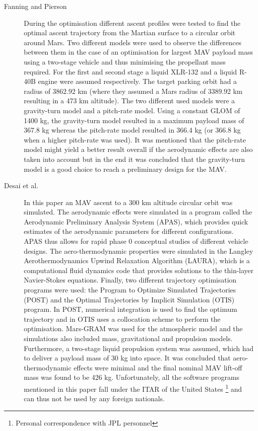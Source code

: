 
\begin{description}
\item[Fanning and Pierson \cite{fanning1996model}]During the optimisation different ascent profiles were tested to find the optimal ascent trajectory from the Martian surface to a circular orbit around Mars. Two different models were used to observe the differences between them in the case of an optimisation for largest \ac{MAV} payload mass using a two-stage vehicle and thus minimising the propellant mass required. For the first and second stage a liquid XLR-132 and a liquid R-40B engine were assumed respectively. The target parking orbit had a radius of 3862.92 km (where they assumed a Mars radius of 3389.92 km resulting in a 473 km altitude). The two different used models were a gravity-turn model and a pitch-rate model. Using a constant \ac{GLOM} of 1400 kg, the gravity-turn model resulted in a maximum payload mass of 367.8 kg whereas the pitch-rate model resulted in 366.4 kg (or 366.8 kg when a higher pitch-rate was used). It was mentioned that the pitch-rate model might yield a better result overall if the aerodynamic effects are also taken into account but in the end it was concluded that the gravity-turn model is a good choice to reach a preliminary design for the \ac{MAV}.
\item[Desai et al. \cite{desai1998}] In this paper an \ac{MAV} ascent to a 300 km altitude circular orbit was simulated. The aerodynamic effects were simulated in a program called the Aerodynamic Preliminary Analysis System (APAS), which provides quick estimates of the aerodynamic parameters for different configurations. APAS thus allows for rapid phase 0 conceptual studies of different vehicle designs. The aero-thermodynamic properties were simulated in the Langley Aerothermodynamics Upwind Relaxation Algorithm (LAURA), which is a computational fluid dynamics code that provides solutions to the thin-layer Navier-Stokes equations. Finally, two different trajectory optimisation programs were used: the Program to Optimize Simulated Trajectories (POST) and the Optimal Trajectories by Implicit Simulation (OTIS) program. In POST, numerical integration is used to find the optimum trajectory and in OTIS uses a collocation scheme to perform the optimisation. Mars-\ac{GRAM} was used for the atmospheric model and the simulations also included mass, gravitational and propulsion models. Furthermore, a two-stage liquid propulsion system was assumed, which had to deliver a payload mass of 30 kg into space. It was concluded that aero-thermodynamic effects were minimal and the final nominal \ac{MAV} lift-off mass was found to be 426 kg. Unfortunately, all the software programs mentioned in this paper fall under the \ac{ITAR} of the United States \footnote{Personal correspondence with \ac{JPL} personnel} and can thus not be used by any foreign nationals.

\end{description}
